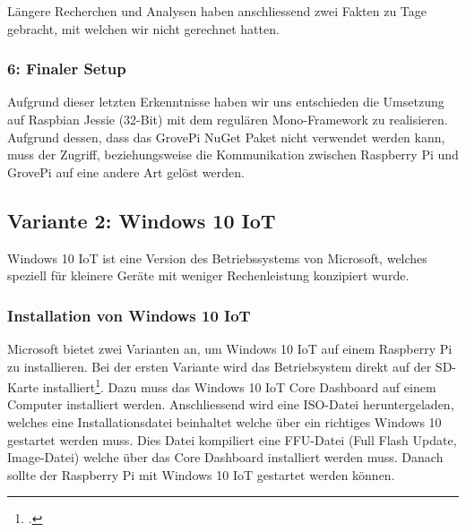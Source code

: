 Längere Recherchen und Analysen haben anschliessend zwei Fakten zu Tage gebracht, mit welchen wir nicht gerechnet hatten.
\begin{itemize}
\end{itemize}


\subsubsection{6: Finaler Setup}
Aufgrund dieser letzten Erkenntnisse haben wir uns entschieden die Umsetzung auf Raspbian Jessie (32-Bit) mit dem regulären Mono-Framework zu realisieren. Aufgrund dessen, dass das GrovePi NuGet Paket nicht verwendet werden kann, muss der Zugriff, beziehungsweise die Kommunikation zwischen Raspberry Pi und GrovePi auf eine andere Art gelöst werden.


\subsection{Variante 2: Windows 10 IoT}
Windows 10 IoT ist eine Version des Betriebssystems von Microsoft, welches speziell für kleinere Geräte mit weniger Rechenleistung konzipiert wurde.

\subsubsection{Installation von Windows 10 IoT}
Microsoft bietet zwei Varianten an, um Windows 10 IoT auf einem Raspberry Pi zu installieren. Bei der ersten Variante wird das Betriebsystem direkt auf der SD-Karte installiert\footcite{install_win10iot_2016-04-25}. Dazu muss das Windows 10 IoT Core Dashboard auf einem Computer installiert werden. Anschliessend wird eine ISO-Datei heruntergeladen, welches eine Installationsdatei beinhaltet welche über ein richtiges Windows 10 gestartet werden muss. Dies Datei kompiliert eine FFU-Datei (Full Flash Update, Image-Datei) welche über das Core Dashboard installiert werden muss. Danach sollte der Raspberry Pi mit Windows 10 IoT gestartet werden können. 

